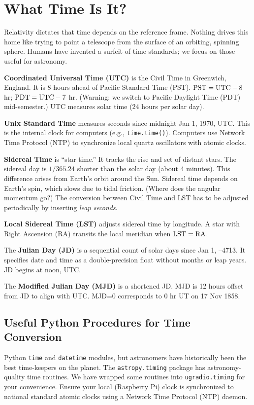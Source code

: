 \documentclass[11pt,preprint]{aastex}
\begin{document}
\section{What Time Is It?} \label{jultime}

\noindent
Relativity dictates that time depends on the reference frame.
Nothing drives this home like trying to point a telescope from the surface of an orbiting, spinning sphere.
Humans have invented a surfeit of time standards; we focus on those useful for astronomy.

{\bf Coordinated Universal Time (UTC)} is the Civil Time in Greenwich, England.
It is 8 hours ahead of Pacific Standard Time (PST).
${\rm PST}={\rm UTC} - 8$ hr; ${\rm PDT}={\rm UTC} - 7$ hr.
(Warning: we switch to Pacific Daylight Time (PDT) mid-semester.)
UTC measures solar time (24 hours per solar day).

{\bf Unix Standard Time} measures seconds since midnight Jan 1, 1970, UTC.
This is the internal clock for computers (e.g., {\tt time.time()}).
Computers use Network Time Protocol (NTP) to synchronize local quartz
oscillators with atomic clocks.

{\bf Sidereal Time} is ``star time.''
It tracks the rise and set of distant stars.
The sidereal day is $1/365.24$ shorter than the solar day (about 4 minutes).
This difference arises from Earth's orbit around the Sun.
Sidereal time depends on Earth's spin, which slows due to tidal friction.
(Where does the angular momentum go?) The conversion between Civil Time and LST has to be adjusted
periodically by inserting {\it leap seconds}.

{\bf Local Sidereal Time (LST)} adjusts sidereal time by longitude.
A star with Right Ascension (RA) transits the local meridian when
${\rm LST}={\rm RA}$.

The {\bf Julian Day (JD)} is a sequential count of solar days since
Jan 1, --4713.
It specifies date and time as a double-precision float without months or leap years.
JD begins at noon, UTC.

The {\bf Modified Julian Day (MJD)} is a shortened JD.
MJD is 12 hours offset from JD to align with UTC.
MJD=0 corresponds to 0 hr UT on 17 Nov 1858.


\subsection{ Useful Python Procedures for Time Conversion}

\noindent
Python {\tt time} and {\tt datetime} modules, but
astronomers have historically been the best time-keepers on the planet.
The {\tt astropy.timing} package has astronomy-quality time routines.
We have wrapped some routines into {\tt ugradio.timing} for your convenience.
Ensure your local (Raspberry Pi) clock is synchronized to national standard
atomic clocks using a Network Time Protocol
(NTP) daemon.
\end{document}
